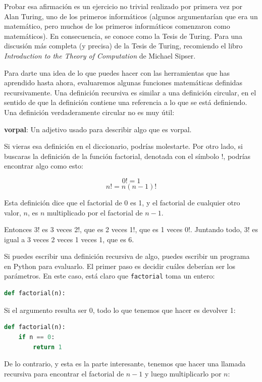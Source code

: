 Probar esa afirmación es un ejercicio no trivial realizado por primera vez por Alan Turing, uno de los primeros informáticos (algunos argumentarían que era un matemático, pero muchos de los primeros informáticos comenzaron como matemáticos). En consecuencia, se conoce como la Tesis de Turing. Para una discusión más completa (y precisa) de la Tesis de Turing, recomiendo el libro \textit{Introduction to the Theory of Computation} de Michael Sipser.

Para darte una idea de lo que puedes hacer con las herramientas que has aprendido hasta ahora, evaluaremos algunas funciones matemáticas definidas recursivamente. Una definición recursiva es similar a una definición circular, en el sentido de que la definición contiene una referencia a lo que se está definiendo. Una definición verdaderamente circular no es muy útil:

\textbf{vorpal}: Un adjetivo usado para describir algo que es vorpal.

Si vieras esa definición en el diccionario, podrías molestarte. Por otro lado, si buscaras la definición de la función factorial, denotada con el símbolo !, podrías encontrar algo como esto:

\[
0! = 1
\]
\[
n! = n(n-1)!
\]

Esta definición dice que el factorial de 0 es 1, y el factorial de cualquier otro valor, $n$, es $n$ multiplicado por el factorial de $n-1$.

Entonces 3! es 3 veces 2!, que es 2 veces 1!, que es 1 veces 0!. Juntando todo, 3! es igual a 3 veces 2 veces 1 veces 1, que es 6.

Si puedes escribir una definición recursiva de algo, puedes escribir un programa en Python para evaluarlo. El primer paso es decidir cuáles deberían ser los parámetros. En este caso, está claro que \texttt{factorial} toma un entero:

\begin{lstlisting}[language=Python]
def factorial(n):
\end{lstlisting}

Si el argumento resulta ser 0, todo lo que tenemos que hacer es devolver 1:

\begin{lstlisting}[language=Python]
def factorial(n):
    if n == 0:
        return 1
\end{lstlisting}

De lo contrario, y esta es la parte interesante, tenemos que hacer una llamada recursiva para encontrar el factorial de $n-1$ y luego multiplicarlo por $n$:

